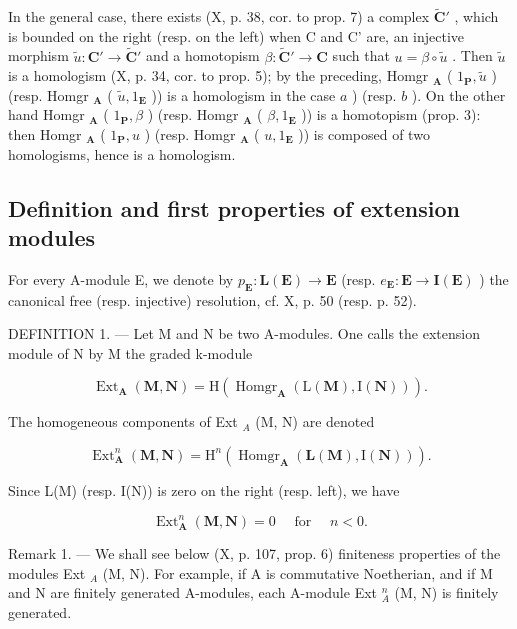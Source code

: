 In the general case, there exists (X, p. 38, cor. to prop. 7) a complex \(\tilde{\mathbf{C}}'\) , which is bounded on the right (resp. on the left) when C and C' are, an injective morphism \(\tilde{u}: \mathbf{C}' \to \tilde{\mathbf{C}}'\) and a homotopism \(\beta: \tilde{\mathbf{C}}' \to \mathbf{C}\) such that \(u = \beta \circ \tilde{u}\) . Then \(\tilde{u}\) is a homologism (X, p. 34, cor. to prop. 5); by the preceding, Homgr \(_{\mathbf{A}}\) ( \(1_{\mathbf{P}}, \tilde{u}\) ) (resp. Homgr \(_{\mathbf{A}}\) ( \(\tilde{u}, 1_{\mathbf{E}}\) )) is a homologism in the case \(a\) ) (resp. \(b\) ). On the other hand Homgr \(_{\mathbf{A}}\) ( \(1_{\mathbf{P}}, \beta\) ) (resp. Homgr \(_{\mathbf{A}}\) ( \(\beta, 1_{\mathbf{E}}\) )) is a homotopism (prop. 3): then Homgr \(_{\mathbf{A}}\) ( \(1_{\mathbf{P}}, u\) ) (resp. Homgr \(_{\mathbf{A}}\) ( \(u, 1_{\mathbf{E}}\) )) is composed of two homologisms, hence is a homologism.

\subsection{Definition and first properties of extension modules}

For every A-module E, we denote by \(p_{\mathbf{E}} : \mathbf{L}(\mathbf{E}) \to \mathbf{E}\) (resp. \(e_{\mathbf{E}} : \mathbf{E} \to \mathbf{I}(\mathbf{E})\) ) the canonical free (resp. injective) resolution, cf. X, p. 50 (resp. p. 52).

DEFINITION 1. --- Let M and N be two A-modules. One calls the extension module of N by M the graded k-module

\[
\operatorname{Ext} _ {\mathbf {A}} (\mathbf {M}, \mathbf {N}) = \mathrm{H} \left(\operatorname{Homgr} _ {\mathbf {A}} (\mathrm{L} (\mathbf {M}), \mathrm{I} (\mathbf {N}))\right).\tag{4}
\]

The homogeneous components of Ext \(_{A}\) (M, N) are denoted

\[
\operatorname{Ext} _ {\mathbf {A}} ^ {n} (\mathbf {M}, \mathbf {N}) = \mathrm{H} ^ {n} \left(\operatorname{Homgr} _ {\mathbf {A}} (\mathbf {L} (\mathbf {M}), \mathrm{I} (\mathbf {N}))\right).\tag{5}
\]

Since L(M) (resp. I(N)) is zero on the right (resp. left), we have

\[
\operatorname{Ext} _ {\mathbf {A}} ^ {n} (\mathbf {M}, \mathbf {N}) = 0 \quad \text { for } \quad n <   0.\tag{6}
\]

Remark 1. --- We shall see below (X, p. 107, prop. 6) finiteness properties of the modules Ext \(_{A}\) (M, N). For example, if A is commutative Noetherian, and if M and N are finitely generated A-modules, each A-module Ext \(_{A}^{n}\) (M, N) is finitely generated.

